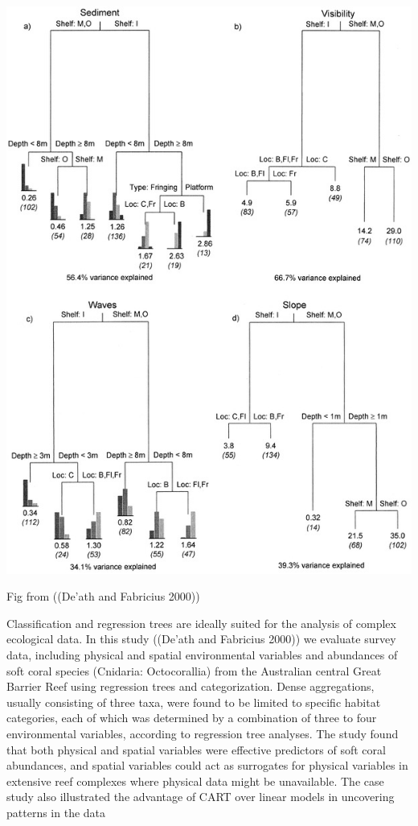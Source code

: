 \documentclass[
  letterpaper,
  DIV=11,
  numbers=noendperiod]{scrreprt}
\begin{document}
\includegraphics{CART.png}

Fig from ((De'ath and Fabricius 2000))

Classification and regression trees are ideally suited for the analysis
of complex ecological data. In this study ((De'ath and Fabricius 2000))
we evaluate survey data, including physical and spatial environmental
variables and abundances of soft coral species (Cnidaria: Octocorallia)
from the Australian central Great Barrier Reef using regression trees
and categorization. Dense aggregations, usually consisting of three
taxa, were found to be limited to specific habitat categories, each of
which was determined by a combination of three to four environmental
variables, according to regression tree analyses. The study found that
both physical and spatial variables were effective predictors of soft
coral abundances, and spatial variables could act as surrogates for
physical variables in extensive reef complexes where physical data might
be unavailable. The case study also illustrated the advantage of CART
over linear models in uncovering patterns in the data\hspace{0pt}
\end{document}
